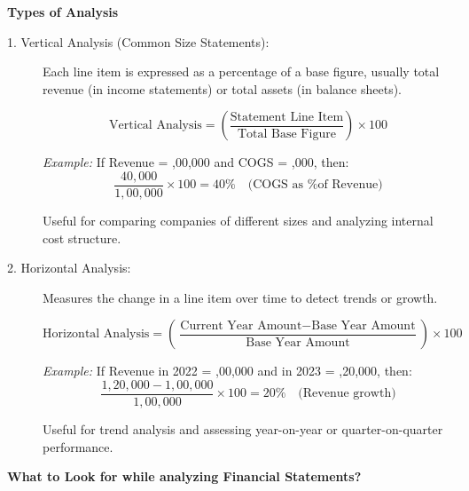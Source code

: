 \documentclass[12pt]{article}
\begin{document}
\textbf{Types of Analysis}
\begin{description}
    \item[1. Vertical Analysis (Common Size Statements):]
    Each line item is expressed as a percentage of a base figure, usually total revenue (in income statements) or total assets (in balance sheets).

    \[
    \text{Vertical Analysis} = \left( \frac{\text{Statement Line Item}}{\text{Total Base Figure}} \right) \times 100
    \]

    \textit{Example:} If Revenue = ,00,000 and COGS = ,000, then:
    \[
    \frac{40,000}{1,00,000} \times 100 = 40\% \quad \text{(COGS as \% of Revenue)}
    \]

    Useful for comparing companies of different sizes and analyzing internal cost structure.\\

    \item[2. Horizontal Analysis:]
    Measures the change in a line item over time to detect trends or growth.

    \[
    \text{Horizontal Analysis} = \left( \frac{\text{Current Year Amount} - \text{Base Year Amount}}{\text{Base Year Amount}} \right) \times 100
    \]

    \textit{Example:} If Revenue in 2022 = ,00,000 and in 2023 = ,20,000, then:
    \[
    \frac{1,20,000 - 1,00,000}{1,00,000} \times 100 = 20\% \quad \text{(Revenue growth)}
    \]

    Useful for trend analysis and assessing year-on-year or quarter-on-quarter performance.
\end{description}

\textbf{What to Look for while analyzing Financial Statements?}
\end{document}
